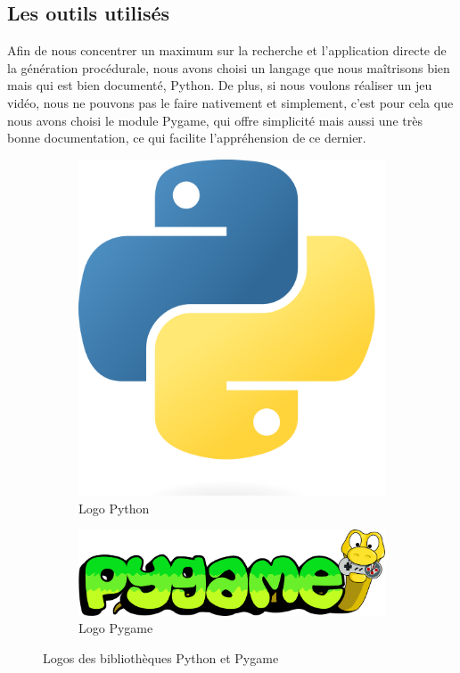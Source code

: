 \documentclass{article}
\begin{document}
\subsection{Les outils utilisés}
Afin de nous concentrer un maximum sur la recherche et l'application directe de la génération procédurale, nous avons choisi un langage que nous maîtrisons bien mais qui est bien documenté, Python. De plus, si nous voulons réaliser un jeu vidéo, nous ne pouvons pas le faire nativement et simplement, c'est pour cela que nous avons choisi le module Pygame, qui offre simplicité mais aussi une très bonne documentation, ce qui facilite l’appréhension de ce dernier.\par
\begin{figure}[!h]
  \centering
  \begin{subfigure}[b]{0.2\textwidth}
    \centering
    \includegraphics[width=\textwidth]{assets/python_logo.png}
    \caption{Logo Python}
  \end{subfigure}
  \hspace{0.6cm}
  \begin{subfigure}[b]{0.2\textwidth}
    \centering
    \includegraphics[width=\textwidth]{assets/pygame_logo.png}
    \caption{Logo Pygame}
  \end{subfigure}
  \caption{Logos des bibliothèques Python et Pygame}
  \label{fig:logos_python}
  
\end{figure}
\end{document}
